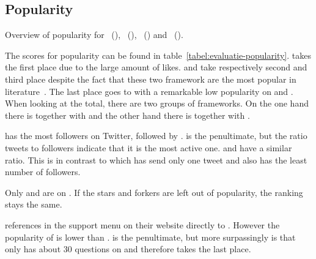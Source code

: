 \documentclass[a4paper]{artikel3}
\begin{document}
\subsection{Popularity} %
\label{sec:evaluation-popularity}

\begin{table}
\centering
\resizebox{8.5cm}{!} {
}
\caption{Overview of popularity for \st{}~(\sta), \kendo{}~(\kendoa), \jqm{}~(\jqma) and \lungo{}~(\lungoa).}
\label{tabel:evaluatie-popularity}
\end{table}

The scores for popularity can be found in table~\ref{tabel:evaluatie-popularity}. 
\kendob{} takes the first place due to the large amount of \fb{} likes.
\jqma{} and \sta{} take respectively second and third place despite the fact that these two framework are the most popular in literature~\cite{David2011,Firtman2013,Hales2012,Oeflman2011}. 
The last place goes to \lungo{} with a remarkable low popularity on \so{} and \fb.
When looking at the total, there are two groups of frameworks.
On the one hand there is \kendob{} together with \jqma{} and the other hand there is \sta{} together with \lungo{}.

\jqma{} has the most followers on Twitter, followed by \kendob.
\lungo{} is the penultimate, but the ratio tweets to followers indicate that it is the most active one. 
\jqma{} and \kendob{} have a similar ratio.
This is in contrast to \sta{} which has send only one tweet and also has the least number of followers. 

Only \jqma{} and \lungo{} are on \gh{}. 
If the \gh{} stars and \gh{} forkers are left out of popularity, the ranking stays the same.

\kendob{} references in the support menu on their website directly to \so{}. 
However the popularity of \kendob{} is lower than \jqma{}.
\sta{} is the penultimate, but more surpassingly is that \lungo{} only has about 30 questions on \so{} and therefore takes the last place.
\end{document}

